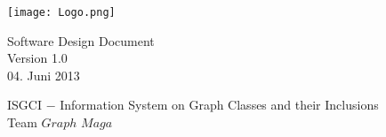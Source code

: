 \documentclass[10pt,a4paper]{article}
\begin{document}
\thispagestyle{empty} %
\begin{center}
\texttt{[image: Logo.png]}
\end{center}


\vspace*{1cm} 
\begin{center}
{\huge Software Design Document}\\
{\large Version 1.0}\\
{\large 04. Juni 2013}\\
\end{center}

\begin{center}
{\large ISGCI $-$ Information System on Graph Classes and their Inclusions}\\
{\large Team $Graph$ $Maga$}
\end{center}


\newpage


\tableofcontents
\newpage
\end{document}
